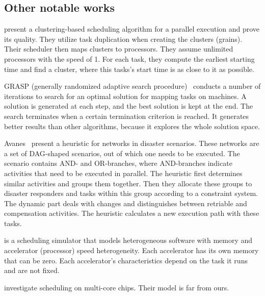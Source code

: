 \documentclass[conference]{IEEEtran}
\begin{document}
    \subsection{Other notable works}

    \cite{palis1996task} present a clustering-based scheduling algorithm for a parallel execution and prove its quality.
    They utilize task duplication when creating the clusters (grains).
    Their scheduler then maps clusters to processors.
    They assume unlimited processors with the speed of 1.
    For each task, they compute the earliest starting time and find a cluster, where this tasks's start time is as close
    to it as possible.

    GRASP (generally randomized adaptive search procedure)~\cite{feo1989probabilistic} conducts a number of iterations
    to search for an optimal solution for mapping tasks on machines.
    A solution is generated at each step, and the best solution is kept at the end.
    The search terminates when a certain termination criterion is reached.
    It generates better results than other algorithms, because it explores the whole solution space.

    Avanes~\etal\cite{avanes2008adaptive} present a heuristic for networks in disaster scenarios.
    These networks are a set of DAG-shaped scenarios, out of which one needs to be executed.
    The scenario contains AND- and OR-branches, where AND-branches indicate activities that need to be executed in parallel.
    The heuristic first determines similar activities and groups them together.
    Then they allocate these groups to disaster responders and tasks within this group according to a constraint system.
    The dynamic part deals with changes and distinguishes between retriable and compensation activities.
    The heuristic calculates a new execution path with these tasks.


    \cite{lutke2024hetsim} is a scheduling simulator that models heterogeneous software with memory and accelerator
    (processor) speed heterogeneity.
    Each accelerator has its own memory that can be zero.
    Each accelerator's characteristics depend on the task it runs and are not fixed.




    \cite{meng2018traffic} investigate scheduling on multi-core chips.
    Their model is far from ours.
\end{document}
